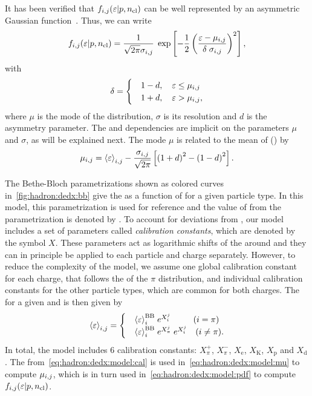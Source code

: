 It has been verified that $f_{i,j}(\mbox{$\varepsilon$}|p,\mbox{$n_{\text{cl}}$})$
can be well represented by an asymmetric
Gaussian function~\cite{GaborVeresThesis}. 
Thus, we can write
\begin{equation}
  f_{i,j}(\mbox{$\varepsilon$}|p,\mbox{$n_{\text{cl}}$}) = \frac{1}{\sqrt{2\pi}\sigma_{i,j}} \;
  \exp\left[-\frac{1}{2}\left(\frac{\mbox{$\varepsilon$}-\mu_{i,j}}{\delta \; \sigma_{i,j}}\right)^2\right],
  \label{eq:hadron:dedx:model:pdf}
\end{equation}
with
\begin{equation}
  \delta =
  \begin{cases}
    & 1-d, \ \ \ \mbox{$\varepsilon$} \le \mu_{i,j} \\
    & 1+d, \ \ \ \mbox{$\varepsilon$} > \mu_{i,j}, \\
  \end{cases}
  \label{eq:hadron:dedx:model:asymm}
\end{equation}
where $\mu$ is the mode of the distribution, $\sigma$ is its resolution
and $d$ is the asymmetry parameter. The \pp and \ncl dependencies are implicit
on the parameters $\mu$ and $\sigma$, as will be explained next.
The mode $\mu$ is related to the mean of \eps (\meaneps) by
\begin{equation}
  \mu_{i,j} = \mbox{$\langle\varepsilon\rangle$}_{i,j} - \frac{\sigma_{i,j}}{\sqrt{2\pi}}
  \left[\left(1+d\right)^2 - \left(1-d\right)^2 \right].
  \label{eq:hadron:dedx:model:mu}
\end{equation}

The Bethe-Bloch parametrizations shown as colored curves
in~\cref{fig:hadron:dedx:bb} give the \meaneps as a
function of \pp for a given particle type.
In this model, this parametrization is used for reference
and the value of \meaneps from the parametrization
is denoted by \meanepsbb.
To account for deviations from \meanepsbb,
our model includes a set of parameters called
\textit{calibration constants}, which are denoted by the symbol $X$.
These parameters act as logarithmic shifts of the \meaneps
around \meanepsbb and they can in principle be applied
to each particle and charge separately. However, to reduce the complexity
of the model, we assume one global calibration constant
for each charge, that follows the \meaneps of the $\pi$ distribution,
and individual calibration constants for the other particle types,
which are common for both charges. The \meaneps for a
given \ipart and \ich is then given by
\begin{equation}
  \meaneps_{\ipart,\ich} =
  \begin{cases}
    & \meaneps_{\ipart}^\text{BB} \; e^{X_{\ipart}^{\ich}} \ \ \ \ \ \ \ \ (i=\pi) \\
    & \meaneps_{\ipart}^\text{BB} \; e^{X_{\pi}^{\ich}} \; e^{X_{\ipart}^{\ich}} \ \ \ (i\neq\pi).
  \end{cases}
  \label{eq:hadron:dedx:model:cal}
\end{equation}
In total, the model includes 6 calibration constants:
$X_{\pi}^{+}$, $X_{\pi}^{-}$, $X_\text{e}$, $X_\text{K}$, $X_\text{p}$ and $X_\text{d}$.
The \meaneps from~\cref{eq:hadron:dedx:model:cal} is used
in~\cref{eq:hadron:dedx:model:mu} to compute $\mu_{i,j}$,
which is in turn used in~\cref{eq:hadron:dedx:model:pdf}
to compute $f_{i,j}(\mbox{$\varepsilon$}|p,\mbox{$n_{\text{cl}}$})$.

